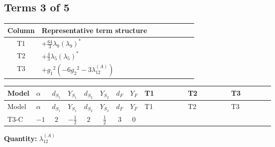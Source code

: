 \documentclass[8pt]{article}
\begin{document}
\begin{landscape}
\subsection*{Terms 3 of 5}
\begin{center}
\begin{tabular}{@{}c >{\raggedright\arraybackslash}p{0.82\linewidth}@{}}
\toprule
Column & Representative term structure \\
\midrule
T1 & \(\displaystyle +\frac{64}{3} {\lambda_{9}} \left({\lambda_{9}}\right)^{*}\) \\
\midrule
T2 & \(\displaystyle +\frac{4}{3} {\lambda_5} \left({\lambda_5}\right)^{*}\) \\
\midrule
T3 & \(\displaystyle +{g_1}^2 \left(-6 {g_2}^2-3 {\lambda_{12}^{(A)}}\right)\) \\
\midrule
\bottomrule
\end{tabular}
\end{center}
\smallskip
\tiny
\begin{longtable}{@{}llcccccc >{\raggedright\arraybackslash}p{0.21\linewidth} >{\raggedright\arraybackslash}p{0.21\linewidth} >{\raggedright\arraybackslash}p{0.21\linewidth}@{}}
\toprule
Model & $\alpha$ & $d_{S_1}$ & $Y_{S_1}$ & $d_{S_2}$ & $Y_{S_2}$ & $d_F$ & $Y_F$ & T1 & T2 & T3 \\
\midrule
\endfirsthead
\toprule
Model & $\alpha$ & $d_{S_1}$ & $Y_{S_1}$ & $d_{S_2}$ & $Y_{S_2}$ & $d_F$ & $Y_F$ & T1 & T2 & T3 \\
\midrule
\endhead
T3-C & $-1$ & $2$ & $-\frac{1}{2}$ & $2$ & $\frac{1}{2}$ & $3$ & $0$ & \scriptsize\adjustbox{max width=\linewidth}{$\begin{gathered} +\frac{64}{3} {\lambda_{9}} \left({\lambda_{9}}\right)^{*}\end{gathered}$} & \scriptsize\adjustbox{max width=\linewidth}{$\begin{gathered} +\frac{4}{3} {\lambda_5} \left({\lambda_5}\right)^{*}\end{gathered}$} & \scriptsize\adjustbox{max width=\linewidth}{$\begin{gathered} +{g_1}^2 \left(-6 {g_2}^2-3 {\lambda_{12}^{(A)}}\right)\end{gathered}$} \\
\midrule
\bottomrule
\end{longtable}
\clearpage
\noindent\textbf{Quantity: }$\lambda_{12}^{(A)}$\par\smallskip

\end{landscape}
\end{document}
